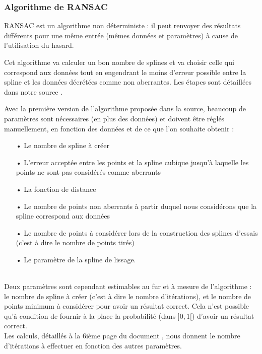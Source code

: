 \documentclass[a4paper,12pt]{article} %
\begin{document}
			    \subsubsection{Algorithme de RANSAC}
			    \label{ransac}
    			   
                    RANSAC est un algorithme non déterministe : il peut renvoyer des résultats différents pour une même entrée (mêmes données et paramètres) à cause de l'utilisation du hasard.
                    
                    Cet algorithme va calculer un bon nombre de splines et va choisir celle qui correspond aux données tout en engendrant le moins d'erreur possible entre la spline et les données décrétées comme non aberrantes. Les étapes sont détaillées dans notre source \cite{RANSAC}.
                    
                    Avec la première version de l'algorithme proposée dans la source, beaucoup de paramètres sont nécessaires (en plus des données) et doivent être réglés manuellement, en fonction des données et de ce que l'on souhaite obtenir :
                    \begin{itemize}
                    \item[•] Le nombre de spline à créer
                    \item[•]  L'erreur acceptée entre les points et la spline cubique jusqu'à laquelle les points ne sont pas considérés comme aberrants
                    \item[•]  La fonction de distance
                    \item[•] Le nombre de points non aberrants à partir duquel nous considérons que la spline correspond aux données
                    \item[•]  Le nombre de points à considérer lors de la construction des splines d'essais (c'est à dire le nombre de points tirés)
                    \item[•] Le paramètre de la spline de lissage.
                    \end{itemize}\\
                    
                    Deux paramètres sont cependant estimables au fur et à mesure de l'algorithme :\\ le nombre de spline à créer (c'est à dire le nombre d'itérations), et le nombre de points minimum à considérer pour avoir un résultat correct. Cela n'est possible qu'à condition de fournir à la place la probabilité (dans $]0,1[$)  d'avoir un résultat correct. \\
                    Les calculs, détaillés à la 6ième page du document \cite{RANSAC}, nous donnent le nombre d'itérations à effectuer en fonction des autres paramètres.
                    
\end{document}
